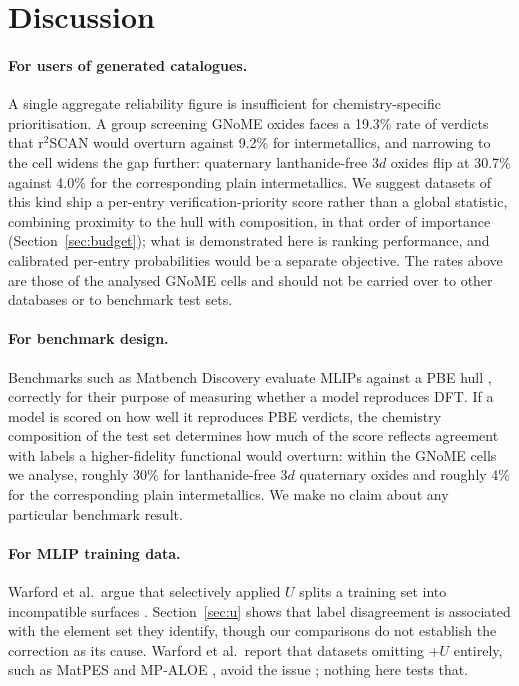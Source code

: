 \documentclass[11pt]{article}
\begin{document}
\section{Discussion}

\paragraph{For users of generated catalogues.} A single aggregate reliability figure is
insufficient for chemistry-specific prioritisation. A group screening GNoME oxides faces
a 19.3\% rate of verdicts that r$^2$SCAN would overturn against 9.2\% for
intermetallics, and narrowing to the cell widens the gap further: quaternary
lanthanide-free 3$d$ oxides flip at 30.7\% against 4.0\% for the corresponding plain
intermetallics. We suggest datasets of this kind ship a per-entry verification-priority score rather
than a global statistic, combining proximity to the hull with composition, in that order
of importance (Section~\ref{sec:budget}); what is demonstrated here is ranking
performance, and calibrated per-entry probabilities would be a separate objective. The rates above are those of the analysed
GNoME cells and should not be carried over to other databases or to benchmark test sets.

\paragraph{For benchmark design.} Benchmarks such as Matbench Discovery evaluate MLIPs
against a PBE hull \citep{riebesell2025}, correctly for their purpose of measuring
whether a model reproduces DFT. If a model is scored on how well it reproduces PBE
verdicts, the chemistry composition of the test set determines how much of the score
reflects agreement with labels a higher-fidelity functional would overturn: within the
GNoME cells we analyse, roughly 30\% for lanthanide-free 3$d$ quaternary oxides and
roughly 4\% for the corresponding plain intermetallics. We make no claim about any
particular benchmark result.

\paragraph{For MLIP training data.} Warford et al.\ argue that selectively applied $U$
splits a training set into incompatible surfaces \citep{warford2026}.
Section~\ref{sec:u} shows that label disagreement is associated with the element set
they identify, though our comparisons do not establish the correction as its cause.
Warford et al.\ report that datasets omitting $+U$ entirely, such as MatPES
\citep{kaplan2025} and MP-ALOE \citep{kuner2025}, avoid the issue \citep{warford2026};
nothing here tests that.
\end{document}
